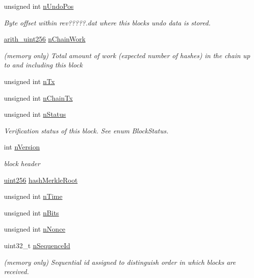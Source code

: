 \begin{DoxyCompactItemize}
unsigned int \hyperlink{class_c_block_index_a865ddd56406c23e98cdc61511a61eb64}{n\+Undo\+Pos}
\begin{DoxyCompactList}\small\item\em Byte offset within rev?????.dat where this block\textquotesingle{}s undo data is stored. \end{DoxyCompactList}\item 
\hyperlink{classarith__uint256}{arith\+\_\+uint256} \hyperlink{class_c_block_index_a31e65c1f491d438dfdcd8d92bdfa73a1}{n\+Chain\+Work}
\begin{DoxyCompactList}\small\item\em (memory only) Total amount of work (expected number of hashes) in the chain up to and including this block \end{DoxyCompactList}\item 
unsigned int \hyperlink{class_c_block_index_ac8e219a377839d2f9133a4387f46e44e}{n\+Tx}
\item 
unsigned int \hyperlink{class_c_block_index_af3c6d6dd8a7579e5ce516d94b98d2db5}{n\+Chain\+Tx}
\item 
unsigned int \hyperlink{class_c_block_index_ac5a336b45ca70e3ed2fc090bf2ee3011}{n\+Status}
\begin{DoxyCompactList}\small\item\em Verification status of this block. See enum Block\+Status. \end{DoxyCompactList}\item 
int \hyperlink{class_c_block_index_a45126301a0a6e26010527a7bbfc1ef58}{n\+Version}
\begin{DoxyCompactList}\small\item\em block header \end{DoxyCompactList}\item 
\hyperlink{classuint256}{uint256} \hyperlink{class_c_block_index_a0601b6b2bd6eaedfbc283c00d045a21c}{hash\+Merkle\+Root}
\item 
unsigned int \hyperlink{class_c_block_index_a4b687a226e9e166b0f91c1b616b543a6}{n\+Time}
\item 
unsigned int \hyperlink{class_c_block_index_a3324894e6af612d1bd76f89378435713}{n\+Bits}
\item 
unsigned int \hyperlink{class_c_block_index_a5e0a648ed1df8da171eba636d5ebef01}{n\+Nonce}
\item 
uint32\+\_\+t \hyperlink{class_c_block_index_a4a679af5f7924cc594b8131371b21e54}{n\+Sequence\+Id}
\begin{DoxyCompactList}\small\item\em (memory only) Sequential id assigned to distinguish order in which blocks are received. \end{DoxyCompactList}\end{DoxyCompactItemize}


